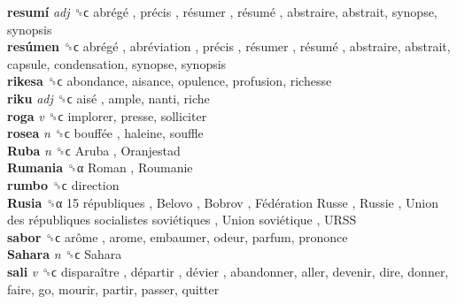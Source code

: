 \textbf{resumí} \emph{adj}  ␝ϲ   abrégé ,  précis ,  résumer ,  résumé , abstraire, abstrait, synopse, synopsis  \\
\textbf{resúmen} ␝ϲ   abrégé ,  abréviation ,  précis ,  résumer ,  résumé , abstraire, abstrait, capsule, condensation, synopse, synopsis  \\
\textbf{rikesa} ␝ϲ  abondance, aisance, opulence, profusion, richesse  \\
\textbf{riku} \emph{adj}  ␝ϲ   aisé , ample, nanti, riche  \\
\textbf{roga} \emph{v}  ␝ϲ  implorer, presse, solliciter  \\
\textbf{rosea} \emph{n}  ␝ϲ   bouffée , haleine, souffle  \\
\textbf{Ruba} \emph{n}  ␝ϲ   Aruba ,  Oranjestad   \\
\textbf{Rumania} ␝α   Roman ,  Roumanie   \\
\textbf{rumbo} ␝ϲ  direction  \\
\textbf{Rusia} ␝α   15 républiques ,  Belovo ,  Bobrov ,  Fédération Russe ,  Russie ,  Union des républiques socialistes soviétiques ,  Union soviétique ,  URSS   \\
\textbf{sabor} ␝ϲ   arôme , arome, embaumer, odeur, parfum, prononce  \\
\textbf{Sahara} \emph{n}  ␝ϲ   Sahara   \\
\textbf{sali} \emph{v}  ␝ϲ   disparaître ,  départir ,  dévier , abandonner, aller, devenir, dire, donner, faire, go, mourir, partir, passer, quitter  \\
